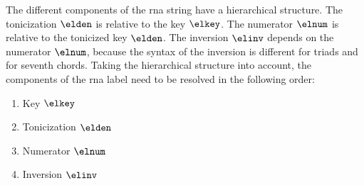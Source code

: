 
The different components of the \gls{rna} string have a
hierarchical structure. The tonicization $\elden$ is
relative to the key $\elkey$. The numerator $\elnum$ is
relative to the tonicized key $\elden$. The inversion
$\elinv$ depends on the numerator $\elnum$, because the
syntax of the inversion is different for triads and for
seventh chords. Taking the hierarchical structure into
account, the components of the \gls{rna} label need to be
resolved in the following order:

\begin{enumerate} 
    \item Key $\elkey$ 
    \item Tonicization $\elden$ 
    \item Numerator $\elnum$ 
    \item Inversion $\elinv$ 
\end{enumerate}
